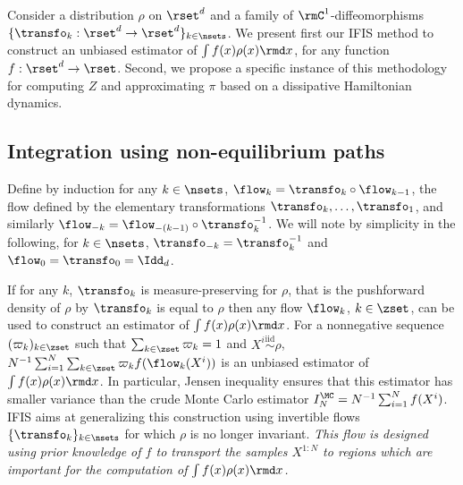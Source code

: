 Consider a distribution $\rho$ on $\rset^{d}$ 
and a family of $\rmC^1$-diffeomorphisms
$\{\transfo_k:\rset^{d}\to \rset^{d}\}_{k\in\nsets}$. 
We present first our IFIS method to construct an unbiased
estimator of $\int f(x) \rho(x) \rmd x$, for any function $f:\rset^{d}\to \rset$. Second, we propose a specific
instance of this methodology for computing $Z$ and
approximating $\pi$ based on a dissipative Hamiltonian dynamics.


\subsection{Integration using non-equilibrium paths} \label{sec:estimator}

 Define by induction for any $k \in \nsets$, $\flow_k = \transfo_k\circ\flow_{k-1}$, the flow defined by the elementary transformations $\transfo_k,\dots,\transfo_1$, and similarly $\flow_{-k}=\flow_{-(k-1)}\circ\transfo_{k}^{-1}$. We will note by simplicity in the following, for $k\in\nsets$, $\transfo_{-k}= \transfo_{k}^{-1}$ and $\flow_0 = \transfo_0 = \Idd_{d}$. 
 
 If  for any $k$, $\transfo_k$ is measure-preserving for $\rho$, that is the pushforward density of $\rho$ by
$\transfo_k$ is equal to $\rho$
then any flow $\flow_k$, $k \in \zset$, can be used to construct
an estimator of $\int f(x) \rho(x) \rmd x$. For a nonnegative sequence $(\varpi_k)_{k \in\zset}$ such that  $\sum_{k\in \zset} \varpi_k=1$ and $X^{i}\overset{\text{iid}}{\sim}\rho$, 
$N^{-1} \sum_{i=1}^N \sum_{k\in \zset} \varpi_k f(\flow_k(X^i))$ is an unbiased estimator of $\int f(x) \rho(x) \rmd x$. In particular, Jensen
inequality ensures that this estimator has smaller variance
than the crude Monte Carlo estimator
$I_N^{\MC}= N^{-1} \sum_{i=1}^Nf(X^i)$.  IFIS aims at generalizing
this construction using invertible flows
$\{\transfo_k\}_{k\in\nsets}$ for which $\rho$ is no longer invariant. 
\emph{This flow is designed
using prior knowledge of $f$ to transport the samples $X^{1:N}$ to
regions which are important for the computation of
$\int f(x) \rho(x) \rmd x$.}

